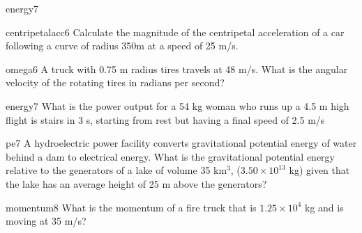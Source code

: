 \documentclass[letterpaper]{article}
\begin{document}
{\begin{question}{energy7}
 
\begin{question}{centripetalacc6}
  Calculate the magnitude of the centripetal acceleration of a car
  following a curve of radius 350m at a speed of 25 m/s.
\begin{choices}
\end{choices}
\end{question}

\begin{question}{omega6}
  A truck with 0.75 m radius tires travels at 48 m/s. What is the
  angular velocity of the rotating tires in radians per second?
\begin{choices}
\end{choices}
\end{question}

\begin{question}{energy7}
  What is the power output for a 54 kg woman who runs up a 4.5 m high
  flight is stairs in 3 s, starting from rest but having a final speed
  of 2.5 m/s
\begin{choices}
\end{choices}
\end{question}

\begin{question}{pe7}
  A hydroelectric power facility converts gravitational potential
  energy of water behind a dam to electrical energy.  What is the
  gravitational potential energy relative to the generators of a lake
  of volume 35 km$^3$, ($3.50 \times 10^{13}$ kg) given that the lake
  has an average height of 25 m above the generators?
\begin{choices}
\end{choices}
\end{question}

\begin{question}{momentum8}
  What is the momentum of a fire truck that is $1.25 \times 10^4$ kg
  and is moving at 35 m/s?
  \begin{choices}
\end{choices}
\end{question}


\end{question}}
\end{document}
